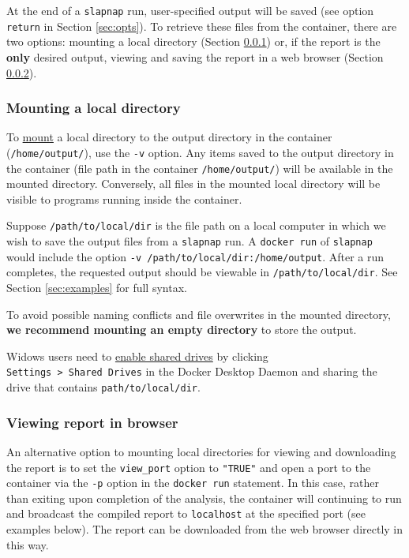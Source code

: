 \documentclass[]{article}
\begin{document}
At the end of a \texttt{slapnap} run, user-specified output will be
saved (see option \texttt{return} in Section \ref{sec:opts}). To
retrieve these files from the container, there are two options: mounting
a local directory (Section \ref{sec:mounting}) or, if the report is the
\textbf{only} desired output, viewing and saving the report in a web
browser (Section \ref{sec:viewreport}).

\subsubsection{Mounting a local directory}\label{sec:mounting}

To \href{https://docs.docker.com/storage/bind-mounts/}{mount} a local
directory to the output directory in the container
(\texttt{/home/output/}), use the \texttt{-v} option. Any items saved to
the output directory in the container (file path in the container
\texttt{/home/output/}) will be available in the mounted directory.
Conversely, all files in the mounted local directory will be visible to
programs running inside the container.

Suppose \texttt{/path/to/local/dir} is the file path on a local computer
in which we wish to save the output files from a \texttt{slapnap} run. A
\texttt{docker\ run} of \texttt{slapnap} would include the option
\texttt{-v\ /path/to/local/dir:/home/output}. After a run completes, the
requested output should be viewable in \texttt{/path/to/local/dir}. See
Section \ref{sec:examples} for full syntax.

To avoid possible naming conflicts and file overwrites in the mounted
directory, \textbf{we recommend mounting an empty directory} to store
the output.

Widows users need to
\href{https://docs.docker.com/docker-for-windows/troubleshoot/\#volume-mounting-requires-shared-drives-for-linux-containers}{enable
shared drives} by clicking
\texttt{Settings\ \textgreater{}\ Shared\ Drives} in the Docker Desktop
Daemon and sharing the drive that contains \texttt{path/to/local/dir}.

\subsubsection{Viewing report in browser}\label{sec:viewreport}

An alternative option to mounting local directories for viewing and
downloading the report is to set the \texttt{view\_port} option to
\texttt{"TRUE"} and open a port to the container via the \texttt{-p}
option in the \texttt{docker\ run} statement. In this case, rather than
exiting upon completion of the analysis, the container will continuing
to run and broadcast the compiled report to \texttt{localhost} at the
specified port (see examples below). The report can be downloaded from
the web browser directly in this way.
\end{document}
